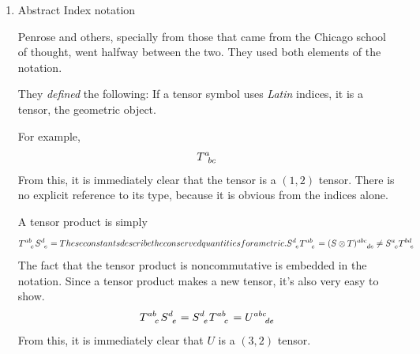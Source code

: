 \begin{enumerate}[(1)]
			It has a few advantages. First, you already know the type of the tensor without being explicitly
			told. From the symbol itself, for example, we can already tell that the tensor above is a $(4,3)$ tensor.
			Second, manipulating it for calculus, contraction, and other operations are easy. There is no need
			to fuss about with the basis vectors or covectors. It is convenient. Physicists are lazy, 
			we love our shortcuts, and we love manipulating numbers easily, and as such, while mathematicians 
			abhor this, physicists prefer it

			However, it also has some drawbacks. You can't easily tell if what you are manipulating 
			is the tensor itself, or just its components. It's hard to check the validity of the mathematics
			you do if it is difficult to identify what is it you are working with. Also, if you 
			manipulate larger tensors, the amount of indices become too many, and it might be 
			more difficult to work with. Lastly,
			mathematicians will not understand what you are referring to. If you give a mathametician, say
			\[
				\tensor{T}{^\mu_\beta}
			\]
			They will not call that a tensor. They will call that a scalar. It's the operation of a tensor
			on the bases. It is a collection of components.
			\[
				T[dx^\beta,\p_\mu]
			\]
			So for them, what physicists refer to as a tensor is not necesarilly a tensor itself. 
			So there is some difficulty collaborating between the two.

		\item Abstract Index notation

			Penrose and others, specially from those that came from the Chicago school of thought,
			went halfway between the two. They used both elements of the notation.

			They \textit{defined} the following: If a tensor symbol uses \textit{Latin} indices,
			it is a tensor, the geometric object.
			
			For example,
			\[
				\tensor{T}{^{a}_{bc}}
			\]
			From this, it is immediately clear that the tensor is a $(1,2)$ tensor. There is no
			explicit reference to its type, because it is obvious from the indices alone.

			A tensor product is simply
			\[
				\tensor{T}{^{ab}_{c}}
				\tensor{S}{^d_e} 
				=
				These constants describe the conserved quantities for a metric.
				\tensor{S}{^d_e}\tensor{T}{^{ab}_c}
				=
				\tensor{(S\otimes T)}{^{abc}_{de}} 
				\neq 
				\tensor{S}{^a_c}\tensor{T}{^{bd}_e}
			\]
			The fact that the tensor product is noncommutative is embedded in the notation.
			Since a tensor product makes a new tensor, it's also very easy to show.
			\[
				\tensor{T}{^{ab}_{c}}
				\tensor{S}{^d_e} 
				=
				\tensor{S}{^d_e}\tensor{T}{^{ab}_c}
				=
				\tensor{U}{^{abc}_{de}}
			\]
			From this, it is immediately clear that $U$ is a $(3,2)$ tensor. 


\end{enumerate}

